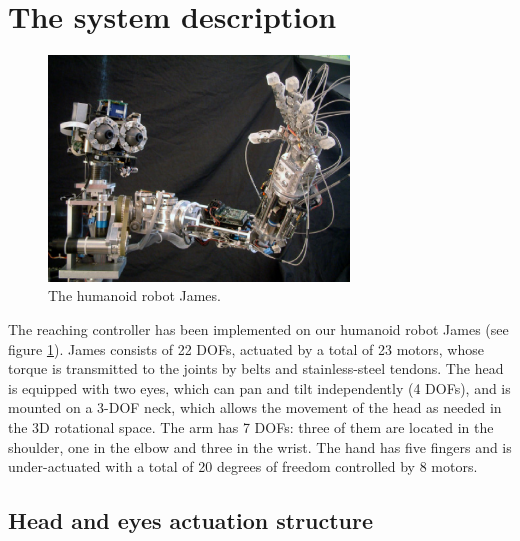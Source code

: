 \section{The system description}

\begin{figure}[h!tbp]
\centering
\includegraphics[width=80mm]{Figure/James1.eps}
\caption{The humanoid robot James.}
\label{Fig:PicureJames}
\end{figure}

The reaching controller has been implemented on our humanoid robot James (see figure \ref{Fig:PicureJames}). James consists of 22 DOFs, actuated by a total of 23 motors, whose torque is transmitted to the joints by belts and stainless-steel tendons. The head is equipped with two eyes, which can pan and tilt independently (4 DOFs), and is mounted on a 3-DOF neck, which allows the movement of the head as needed in the 3D rotational space. The arm has 7 DOFs: three of them are located in the shoulder, one in the elbow and three in the wrist. The hand has five fingers and is under-actuated with a total of 20 degrees of freedom controlled by 8 motors. 


\subsection{Head and eyes actuation structure} \label{Sec:HeadEyesStructure}


